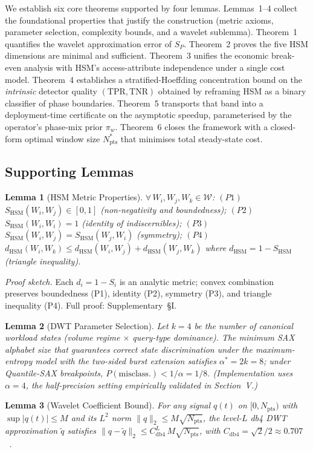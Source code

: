 \documentclass[10pt,twocolumn,a4paper]{article}
\newtheorem{lemma}{Lemma}
\newcommand{\SHSM}{S_{\mathrm{HSM}}}
\newcommand{\SPER}{S_{P}}
\newcommand{\Nstar}{N^{*}_{\mathrm{pts}}}
\newcommand{\Npts}{N_{\mathrm{pts}}}
\newcommand{\dHSM}{d_{\mathrm{HSM}}}
\newcommand{\TPR}{\mathrm{TPR}}
\newcommand{\TNR}{\mathrm{TNR}}
\begin{document}
We establish six core theorems supported by four lemmas.
Lemmas~1--4 collect the foundational properties that justify the
construction (metric axioms, parameter selection, complexity bounds,
and a wavelet sublemma). Theorem~1 quantifies the wavelet approximation
error of $\SPER$. Theorem~2 proves the five HSM dimensions are minimal
and sufficient. Theorem~3 unifies the economic break-even analysis
with HSM's access-attribute independence under a single cost model.
Theorem~4 establishes a stratified-Hoeffding concentration bound on the
\emph{intrinsic} detector quality $(\TPR,\TNR)$ obtained by reframing
HSM as a binary classifier of phase boundaries. Theorem~5 transports
that band into a deployment-time certificate on the asymptotic speedup,
parameterised by the operator's phase-mix prior $\pi_w$. Theorem~6
closes the framework with a closed-form optimal window size $\Nstar$
that minimises total steady-state cost.

\subsection{Supporting Lemmas}

\begin{lemma}[HSM Metric Properties]\label{lem:metric}
$\forall\,W_i,W_j,W_k\in\mathcal{W}$:
$(P1)$~$\SHSM(W_i,W_j)\!\in\![0,1]$ (non-negativity and boundedness);
$(P2)$~$\SHSM(W_i,W_i)\!=\!1$ (identity of indiscernibles);
$(P3)$~$\SHSM(W_i,W_j)\!=\!\SHSM(W_j,W_i)$ (symmetry);
$(P4)$~$\dHSM(W_i,W_k)\leq\dHSM(W_i,W_j)+\dHSM(W_j,W_k)$ where
$\dHSM\!=\!1-\SHSM$ (triangle inequality).
\end{lemma}
\noindent\textit{Proof sketch.}
Each $d_i\!=\!1\!-\!S_i$ is an analytic metric; convex combination preserves boundedness (P1), identity (P2), symmetry (P3), and triangle inequality (P4).
Full proof: Supplementary~\S I.

\begin{lemma}[DWT Parameter Selection]\label{lem:dwt}
Let $k\!=\!4$ be the number of canonical workload states (volume
regime $\times$ query-type dominance). The minimum SAX alphabet size
that guarantees correct state discrimination under the maximum-entropy
model with the two-sided burst extension satisfies $\alpha^{*}\!=\!2k\!=\!8$;
under Quantile-SAX breakpoints,
$P(\mathrm{misclass.})<1/\alpha\!=\!1/8$. (Implementation uses
$\alpha\!=\!4$, the half-precision setting empirically validated
in Section~V.)
\end{lemma}

\begin{lemma}[Wavelet Coefficient Bound]\label{lem:wcb}
For any signal $q(t)$ on $[0,\Npts)$ with $\sup|q(t)|\leq M$ and
its $L^{2}$ norm $\|q\|_{2}\leq M\sqrt{\Npts}$, the level-$L$ db4
DWT approximation $\tilde{q}$ satisfies
$\|q-\tilde{q}\|_{2}\leq C_{\mathrm{db4}}^{L}\,M\sqrt{\Npts}$,
with $C_{\mathrm{db4}}\!=\!\sqrt{2}/2\approx 0.707$~\cite{Mallat1989Wavelets}.
\end{lemma}
\end{document}
